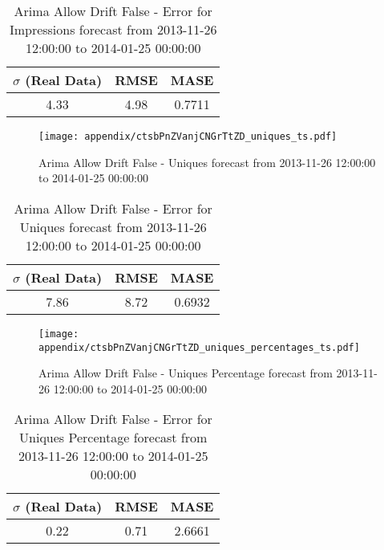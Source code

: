 \begin{table}[H]
\centering
\footnotesize
\begin{tabular}{ccc}
$\sigma$ (Real Data) & RMSE & MASE   \\ \hline
4.33 & 4.98 & 0.7711 \\
\end{tabular}

\vspace{0.5cm}

\caption{
Arima Allow Drift False - Error for Impressions forecast from 2013-11-26 12:00:00 to 2014-01-25 00:00:00}
\end{table}

\begin{figure}[H] \begin{center} \leavevmode
\texttt{[image: appendix/ctsbPnZVanjCNGrTtZD\_uniques\_ts.pdf]} \caption{
Arima Allow Drift False - Uniques forecast from 2013-11-26 12:00:00 to 2014-01-25 00:00:00} \label{fig:appendix/ctsbPnZVanjCNGrTtZD_uniques_ts.pdf} \end{center}
\end{figure}

\begin{table}[H]
\centering
\footnotesize
\begin{tabular}{ccc}
$\sigma$ (Real Data) & RMSE & MASE   \\ \hline
7.86 & 8.72 & 0.6932 \\
\end{tabular}

\vspace{0.5cm}

\caption{
Arima Allow Drift False - Error for Uniques forecast from 2013-11-26 12:00:00 to 2014-01-25 00:00:00}
\end{table}

\begin{figure}[H] \begin{center} \leavevmode
\texttt{[image: appendix/ctsbPnZVanjCNGrTtZD\_uniques\_percentages\_ts.pdf]} \caption{
Arima Allow Drift False - Uniques Percentage forecast from 2013-11-26 12:00:00 to 2014-01-25 00:00:00} \label{fig:appendix/ctsbPnZVanjCNGrTtZD_uniques_percentages_ts.pdf} \end{center}
\end{figure}

\begin{table}[H]
\centering
\footnotesize
\begin{tabular}{ccc}
$\sigma$ (Real Data) & RMSE & MASE   \\ \hline
0.22 & 0.71 & 2.6661 \\
\end{tabular}

\vspace{0.5cm}

\caption{
Arima Allow Drift False - Error for Uniques Percentage forecast from 2013-11-26 12:00:00 to 2014-01-25 00:00:00}
\end{table}

